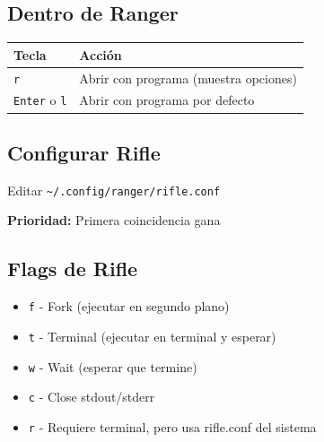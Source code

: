 \documentclass[
  doc,
  floatsintext,
  longtable,
  a4paper,
  nolmodern,
  notxfonts,
  notimes,
  12pt,
  colorlinks=true,linkcolor=blue,citecolor=blue,urlcolor=blue]{apa7}
\newenvironment{Shaded}{\begin{snugshade}}{\end{snugshade}}
\newcommand{\AttributeTok}[1]{\textcolor[rgb]{0.40,0.45,0.13}{#1}}
\newcommand{\CommentTok}[1]{\textcolor[rgb]{0.37,0.37,0.37}{#1}}
\newcommand{\ExtensionTok}[1]{\textcolor[rgb]{0.00,0.23,0.31}{#1}}
\newcommand{\NormalTok}[1]{\textcolor[rgb]{0.00,0.23,0.31}{#1}}
\newcommand{\StringTok}[1]{\textcolor[rgb]{0.13,0.47,0.30}{#1}}
\newcommand{\VariableTok}[1]{\textcolor[rgb]{0.07,0.07,0.07}{#1}}
\providecommand{\tightlist}{%
  \setlength{\itemsep}{0pt}\setlength{\parskip}{0pt}}
\newcounter{none} %
\begin{document}
\subsection{Dentro de Ranger}\label{dentro-de-ranger}

{\def\LTcaptype{none} %
\begin{longtable}[]{@{}ll@{}}
\toprule\noalign{}
Tecla & Acción \\
\midrule\noalign{}
\endhead
\bottomrule\noalign{}
\endlastfoot
\texttt{r} & Abrir con programa (muestra opciones) \\
\texttt{Enter} o \texttt{l} & Abrir con programa por defecto \\
\end{longtable}
}

\subsection{Configurar Rifle}\label{configurar-rifle}

Editar \texttt{\textasciitilde{}/.config/ranger/rifle.conf}

\textbf{Prioridad:} Primera coincidencia gana

\begin{Shaded}
\end{Shaded}

\subsection{Flags de Rifle}\label{flags-de-rifle}

\begin{itemize}
\tightlist
\item
  \texttt{f} - Fork (ejecutar en segundo plano)
\item
  \texttt{t} - Terminal (ejecutar en terminal y esperar)
\item
  \texttt{w} - Wait (esperar que termine)
\item
  \texttt{c} - Close stdout/stderr
\item
  \texttt{r} - Requiere terminal, pero usa rifle.conf del sistema
\end{itemize}
\end{document}

